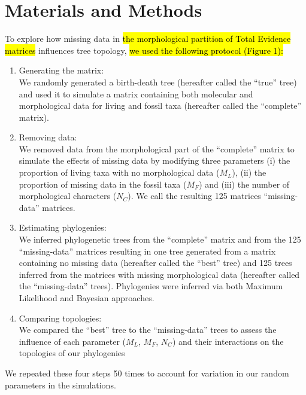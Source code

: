 \documentclass[12pt,letterpaper]{article}
\begin{document}
\section{Materials and Methods}
To explore how missing data in \hl{the morphological partition of Total Evidence matrices} influences tree topology, \hl{we used the following protocol (Figure 1):}
\begin{enumerate}
\item{Generating the matrix:} \label{step:generate_matrix} \\
We randomly generated a birth-death tree (hereafter called the ``true'' tree) and used it to simulate a matrix containing both molecular and morphological data for living and fossil taxa (hereafter called the ``complete'' matrix).
\item{Removing data:} \label{step:remove_data} \\
We removed data from the morphological part of the ``complete'' matrix to simulate the effects of missing data by modifying three parameters (i) the proportion of living taxa with no morphological data ($M_{L}$), (ii) the proportion of missing data in the fossil taxa ($M_{F}$) and (iii) the number of morphological characters ($N_{C}$). We call the resulting 125 matrices ``missing-data'' matrices.
\item{Estimating phylogenies:} \label{step:build_phylo} \\
We inferred phylogenetic trees from the ``complete'' matrix and from the 125 ``missing-data'' matrices resulting in one tree generated from a matrix containing no missing data (hereafter called the ``best'' tree) and 125 trees inferred from the matrices with missing morphological data (hereafter called the ``missing-data'' trees). Phylogenies were inferred via both Maximum Likelihood and Bayesian approaches.
\item{Comparing topologies:} \label{step:compare_topo} \\
We compared the ``best'' tree to the ``missing-data'' trees to assess the influence of each parameter ($M_{L}$, $M_{F}$, $N_{C}$) and their interactions on the topologies of our phylogenies
\end{enumerate}
We repeated these four steps 50 times to account for variation in our random parameters in the simulations.

\end{document}
